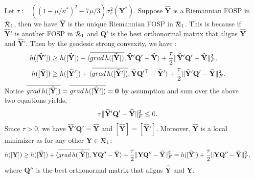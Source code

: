\documentclass[11pt]{article}
\newcommand{\0}{{\mathbf{0}}}
\newcommand{\1}{{\mathbf{1}}}
\newcommand{\Q}{{\mathbf{Q}}}
\newcommand{\Y}{{\mathbf{Y}}}
\newcommand{\cR}{{\cal R}}
\newcommand{\grad}{{\rm grad}}
\newcommand{\F}{{\rm F}}
\begin{document}
 Let $\tau :=  \left((1-\mu/\kappa^*)^2 - 7\mu/3 \right)\sigma^2_r(\Y^*) $. Suppose $\widehat{\Y}$ is a Riemannian FOSP in $\cR_1$, then we have $\widehat{\Y}$ is the unique Riemannian FOSP in $\cR_1$. This is because if $\widehat{\Y}'$ is another FOSP in $\cR_1$ and $\Q'$ is the best orthonormal matrix that aligns $\widehat{\Y}$ and $\widehat{\Y}'$. Then by the geodesic strong convexity, we have \cite[Chapter 11]{boumal2020introduction}: 
 \begin{equation*}
 	\begin{split}
 		h([\widehat{\Y}']) &\geq h([\widehat{\Y}]) + \langle \overline{\grad \, h([\widehat{\Y}])} , \widehat{\Y}'\Q' - \widehat{\Y} \rangle +  \frac{\tau}{2} \| \widehat{\Y}' \Q' - \widehat{\Y} \|_\F^2, \\
 		h([\widehat{\Y}]) &\geq h([\widehat{\Y}']) + \langle \overline{\grad \, h([\widehat{\Y}'])} , \widehat{\Y}\Q'^\top - \widehat{\Y}' \rangle +  \frac{\tau}{2} \| \widehat{\Y}' \Q' - \widehat{\Y} \|_\F^2.
 	\end{split}
 \end{equation*}  Notice $\overline{\grad \, h([\widehat{\Y}])} = \overline{\grad \, h([\widehat{\Y}'])} = \0$ by assumption and sum over the above two equations yields, 
 \begin{equation*}
 	\tau \| \widehat{\Y}' \Q' - \widehat{\Y} \|_\F^2 \leq 0.
 \end{equation*} Since $\tau > 0$, we have $\widehat{\Y}' \Q' = \widehat{\Y}$ and $[\widehat{\Y}] = [\widehat{\Y}']$. Moreover, $\widehat{\Y}$ is a local minimizer as for any other $\Y \in \cR_1$:
 \begin{equation*}
 	h([\Y]) \geq h([\widehat{\Y}]) + \langle \overline{\grad \, h([\widehat{\Y}])} , \Y\Q'' - \widehat{\Y} \rangle +  \frac{\tau}{2} \| \Y \Q'' - \widehat{\Y} \|_\F^2 =   h([\widehat{\Y}]) +   \frac{\tau}{2} \| \Y \Q'' - \widehat{\Y} \|_\F^2,
 \end{equation*} where $\Q''$ is the best orthonormal matrix that aligns $\widehat{\Y}$ and $\Y$.
 
\end{document}
